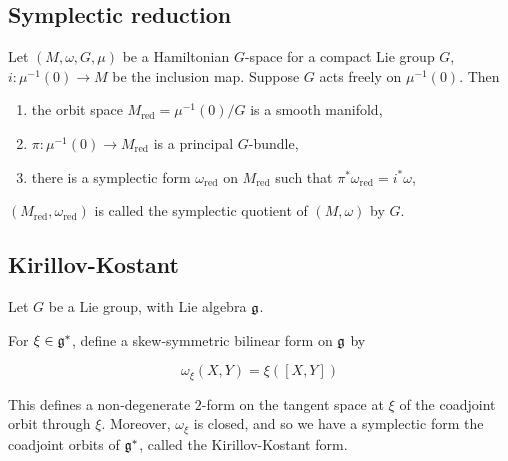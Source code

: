 \subsection{Symplectic reduction}

\begin{theorem}
     Let \((M, \omega, G, \mu)\) be a Hamiltonian \(G\)-space for a compact Lie group \(G\), \(i : \mu^{-1}(0) \to M\) be the inclusion map. Suppose \(G\) acts freely on \(\mu^{-1}(0)\). Then

    \begin{enumerate}
        \item the orbit space \(M_{\text{red}} = \mu^{-1}(0)/G\) is a smooth manifold,
        \item \(\pi : \mu^{-1}(0) \to M_{\text{red}}\) is a principal \(G\)-bundle,
        \item there is a symplectic form \(\omega_{\text{red}}\) on \(M_{\text{red}}\) such that \(\pi^*\omega_{\text{red}} = i^*\omega\),
    \end{enumerate}
\end{theorem}

\begin{definition}
     \((M_{\text{red}}, \omega_{\text{red}})\) is called the symplectic quotient of \((M, \omega)\) by \(G\).
\end{definition}

\subsection{Kirillov-Kostant}

Let \(G\) be a Lie group, with Lie algebra \(\mathfrak{g}\).

For \(\xi \in \mathfrak{g}^*\), define a skew-symmetric bilinear form on \(\mathfrak{g}\) by

\[\omega_\xi(X, Y) = \xi([X, Y])\]

This defines a non-degenerate \(2\)-form on the tangent space at \(\xi\) of the coadjoint orbit through \(\xi\). Moreover, \(\omega_\xi\) is closed, and so we have a symplectic form the coadjoint orbits of \(\mathfrak{g}^*\), called the Kirillov-Kostant form.

